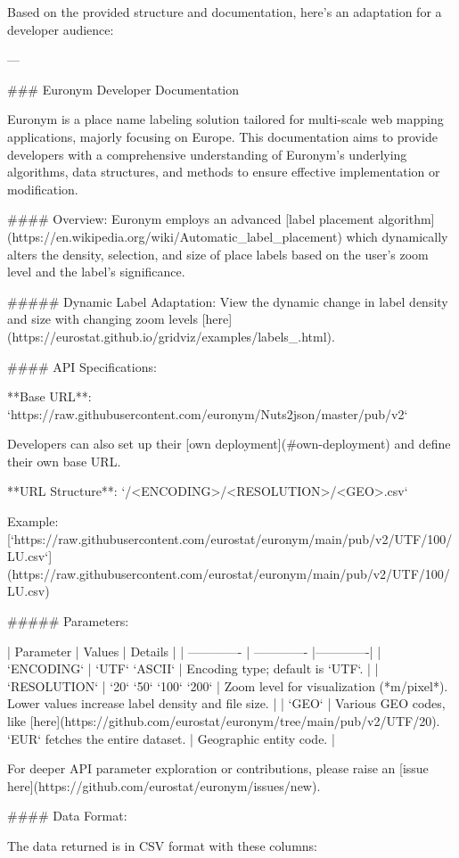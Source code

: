 Based on the provided structure and documentation, here's an adaptation for a developer audience:

---

### Euronym Developer Documentation

Euronym is a place name labeling solution tailored for multi-scale web mapping applications, majorly focusing on Europe. This documentation aims to provide developers with a comprehensive understanding of Euronym's underlying algorithms, data structures, and methods to ensure effective implementation or modification.

#### Overview:
Euronym employs an advanced [label placement algorithm](https://en.wikipedia.org/wiki/Automatic_label_placement) which dynamically alters the density, selection, and size of place labels based on the user's zoom level and the label's significance.

##### Dynamic Label Adaptation:
View the dynamic change in label density and size with changing zoom levels [here](https://eurostat.github.io/gridviz/examples/labels_.html).

#### API Specifications:

**Base URL**: 
`https://raw.githubusercontent.com/euronym/Nuts2json/master/pub/v2`

Developers can also set up their [own deployment](#own-deployment) and define their own base URL.

**URL Structure**: 
`/<ENCODING>/<RESOLUTION>/<GEO>.csv`

Example:
[`https://raw.githubusercontent.com/eurostat/euronym/main/pub/v2/UTF/100/LU.csv`](https://raw.githubusercontent.com/eurostat/euronym/main/pub/v2/UTF/100/LU.csv)

##### Parameters:

| Parameter | Values | Details |
| ------------- | ------------- |-------------|
| `ENCODING` | `UTF` `ASCII` | Encoding type; default is `UTF`. |
| `RESOLUTION` | `20` `50` `100` `200` | Zoom level for visualization (*m/pixel*). Lower values increase label density and file size. |
| `GEO` | Various GEO codes, like [here](https://github.com/eurostat/euronym/tree/main/pub/v2/UTF/20). `EUR` fetches the entire dataset. | Geographic entity code. |

For deeper API parameter exploration or contributions, please raise an [issue here](https://github.com/eurostat/euronym/issues/new).

#### Data Format:

The data returned is in CSV format with these columns:

